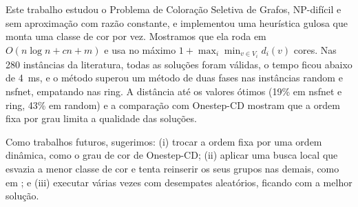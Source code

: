 \documentclass[12pt]{article}
\begin{document}
Este trabalho estudou o Problema de Coloração Seletiva de Grafos, NP-difícil e
sem aproximação com razão constante, e implementou uma heurística gulosa que
monta uma classe de cor por vez. Mostramos que ela roda em
$O(n\log n + cn + m)$ e usa no máximo $1+\max_i\min_{v\in V_i} d_i(v)$ cores.
Nas 280 instâncias da literatura, todas as soluções foram válidas, o tempo
ficou abaixo de 4~ms, e o método superou um método de duas fases nas instâncias
random e nsfnet, empatando nas ring. A distância até os valores ótimos
(19\% em nsfnet e ring, 43\% em random) e a comparação com Onestep-CD mostram
que a ordem fixa por grau limita a qualidade das soluções.

Como trabalhos futuros, sugerimos: (i) trocar a ordem fixa por uma ordem
dinâmica, como o grau de cor de Onestep-CD; (ii) aplicar uma busca local que
esvazia a menor classe de cor e tenta reinserir os seus grupos nas demais, como
em \cite{furini2018}; e (iii) executar várias vezes com desempates aleatórios,
ficando com a melhor solução.



\end{document}
